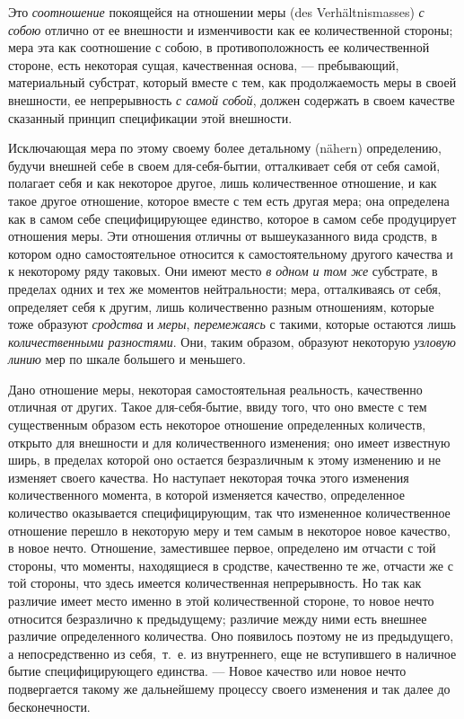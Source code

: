 Это {\em соотношение} покоящейся на отношении меры (des
Verhältnismasses) {\em с собою} отлично от ее внешности
и изменчивости как ее количественной стороны; мера эта как соотношение с
собою, в противоположность ее количественной стороне, есть некоторая сущая,
качественная основа, — пребывающий, материальный субстрат, который вместе с
тем, как продолжаемость меры в своей внешности, ее непрерывность
{\em с самой собой}, должен содержать в своем качестве
сказанный принцип спецификации этой внешности.

Исключающая мера по этому своему более детальному (nähern) определению,
будучи внешней себе в своем для-себя-бытии, отталкивает себя от себя самой,
полагает себя и как некоторое другое, лишь количественное отношение, и как
такое другое отношение, которое вместе с тем есть другая мера; она
определена как в самом себе специфицирующее единство, которое в самом себе
продуцирует отношения меры. Эти отношения отличны от вышеуказанного вида
сродств, в котором одно самостоятельное относится к самостоятельному
другого качества и к некоторому ряду таковых. Они имеют место
{\em в одном и том же} субстрате, в пределах одних и
тех же моментов нейтральности; мера, отталкиваясь от себя, определяет себя
к другим, лишь количественно разным отношениям, которые тоже образуют
{\em сродства} и {\em меры},
{\em перемежаясь} с такими, которые остаются лишь
{\em количественными разностями}. Они, таким образом,
образуют некоторую {\em узловую линию} мер по шкале
большего и меньшего.

Дано отношение меры, некоторая самостоятельная реальность, качественно
отличная от других. Такое для-себя-бытие, ввиду того, что оно вместе с тем
существенным образом есть некоторое отношение определенных количеств,
открыто для внешности и для количественного изменения; оно имеет известную
ширь, в пределах которой оно остается безразличным к этому изменению и не
изменяет своего качества. Но наступает некоторая точка этого изменения
количественного момента, в которой изменяется качество, определенное
количество оказывается специфицирующим, так что измененное количественное
отношение перешло в некоторую меру и тем самым в некоторое новое качество,
в новое нечто. Отношение, заместившее первое, определено им отчасти с той
стороны, что моменты, находящиеся в сродстве, качественно те же, отчасти же
с той стороны, что здесь имеется количественная непрерывность. Но так как
различие имеет место именно в этой количественной стороне, то новое нечто
относится безразлично к предыдущему; различие между ними есть внешнее
различие определенного количества. Оно появилось поэтому не из предыдущего,
а непосредственно из себя,~т.~е. из внутреннего, еще не вступившего в
наличное бытие специфицирующего единства. — Новое качество или новое нечто
подвергается такому же дальнейшему процессу своего изменения и так далее до
бесконечности.

